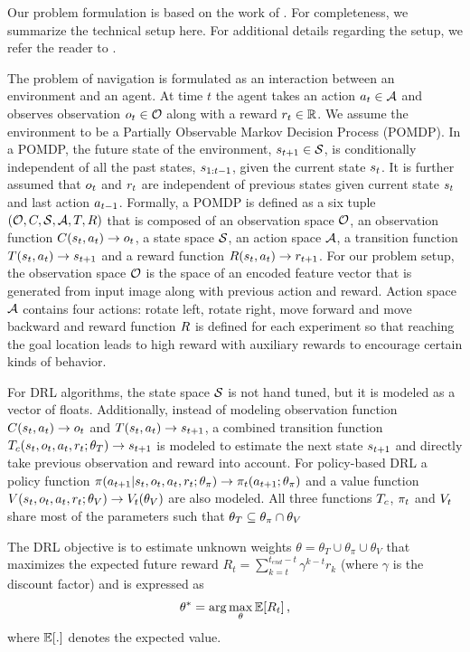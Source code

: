 Our problem formulation is based on the work of \cite{MiPaViICLR2017}. 
For completeness, we summarize the technical setup here.
For additional details regarding the setup, we refer the reader to \cite{MnBaMiICML2016,MiPaViICLR2017}.

The problem of navigation is formulated as an interaction between an environment and an agent.
At time $t$ the agent takes an action $a_t \in \mathcal{A}$ and observes observation $o_t \in \mathcal{O}$ along with a reward $r_t \in \mathbb{R}$.
We assume the environment to be a Partially Observable Markov Decision Process (POMDP).
In a POMDP, the future state of the environment, $s_{t+1} \in \mathcal{S}$, is conditionally independent of all the past states, $s_{1:t-1}$, given the current state $s_t$. It is further assumed that
$o_t$ and $r_t$ are independent of previous states given current state $s_t$ and last action $a_{t-1}$.
Formally, a POMDP is defined as a six tuple $(\mathcal{O}, C, \mathcal{S}, \mathcal{A}, T, R)$ that is composed of an observation space $\mathcal{O}$, an observation function $C(s_t, a_t) \rightarrow o_t$, a state space $\mathcal{S}$, an action space $\mathcal{A}$, a transition function $T(s_t, a_t) \rightarrow s_{t+1}$ and a reward function $R(s_t, a_t) \rightarrow r_{t+1}$.
For our problem setup, the observation space $\mathcal{O}$ is the space of an encoded feature vector that is generated from input image along with previous action and reward.
Action space $\mathcal{A}$ contains four actions: rotate left, rotate right, move forward and move backward and reward function $R$ is defined for each experiment so that reaching the goal location leads to high reward with auxiliary rewards to encourage certain kinds of behavior.

For DRL algorithms, the state space $\mathcal{S}$ is not hand tuned, but it is modeled as a vector of floats.
Additionally, instead of modeling observation function $C(s_t, a_t) \rightarrow o_t$ and $T(s_t, a_t) \rightarrow s_{t+1}$, a combined transition function $T_c(s_t, o_t, a_t, r_t; \theta_T) \rightarrow s_{t+1}$ is modeled to estimate the next state $s_{t+1}$ and directly take previous observation and reward into account.
For policy-based DRL a policy function $\pi(a_{t+1}|s_t, o_t, a_t, r_t; \theta_\pi) \rightarrow \pi_t(a_{t+1} ; \theta_\pi)$ and a value function $V(s_t, o_t, a_t, r_t; \theta_V) \rightarrow V_t(\theta_V)$ are also modeled.
All three functions $T_c$, $\pi_t$ and $V_t$ share most of the parameters such that $\theta_T \subseteq \theta_{\pi} \cap \theta_V$

The DRL objective is to estimate unknown weights $\theta = \theta_T \cup \theta_\pi \cup \theta_V$ that maximizes the expected future reward $R_t = \sum_{k=t}^{t_{end} - t} \gamma^{k-t} r_k$ (where $\gamma$ is the discount factor) and is expressed as
%
\begin{align}
\theta^* = \arg\max_{\theta} \mathbb{E}[R_t] \,,
\end{align}
where $\mathbb{E}[.]$ denotes the expected value.
%


